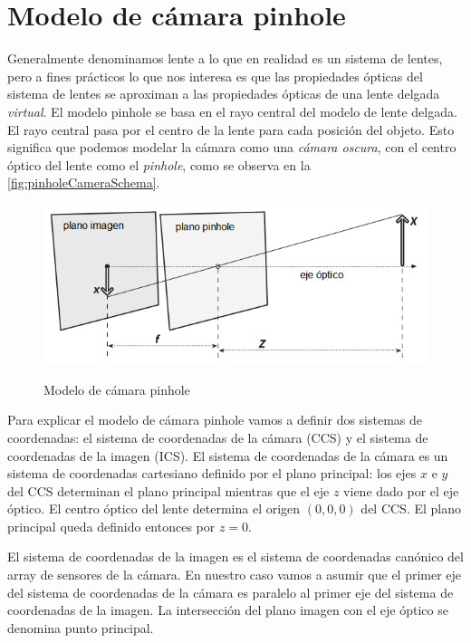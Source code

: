 \section{Modelo de cámara pinhole}
Generalmente denominamos lente a lo que en realidad es un sistema de lentes, pero a fines prácticos lo que nos interesa es que las propiedades ópticas del sistema de lentes se aproximan a las propiedades ópticas de una lente delgada \emph{virtual}. El modelo pinhole se basa en el rayo central del modelo de lente delgada. El rayo central pasa por el centro de la lente para cada posición del objeto. Esto significa que podemos modelar la cámara como una \emph{cámara oscura}, con el centro óptico del lente como el \emph{pinhole}, como se observa en la \autoref{fig:pinholeCameraSchema}.
\begin{figure}[bth]
    \myfloatalign
        {\includegraphics[width=1.0\linewidth]{images/pinholeCameraSchema}}
        \caption{Modelo de cámara pinhole}
        \label{fig:pinholeCameraSchema}
\end{figure}

Para explicar el modelo de cámara pinhole vamos a definir dos sistemas de coordenadas: el sistema de coordenadas de la cámara (CCS) y el sistema de coordenadas de la imagen (ICS). El sistema de coordenadas de la cámara es un sistema de coordenadas cartesiano definido por el plano principal: los ejes $x$ e $y$ del CCS determinan el plano principal mientras que el eje $z$ viene dado por el eje óptico. El centro óptico del lente determina el origen $(0,0,0)$ del CCS. El plano principal queda definido entonces por ${z=0}$. 

El sistema de coordenadas de la imagen es el sistema de coordenadas canónico del array de sensores de la cámara. En nuestro caso vamos a asumir que el primer eje del sistema de coordenadas de la cámara es paralelo al primer eje del sistema de coordenadas de la imagen. La intersección del plano imagen con el eje óptico se denomina punto principal.

